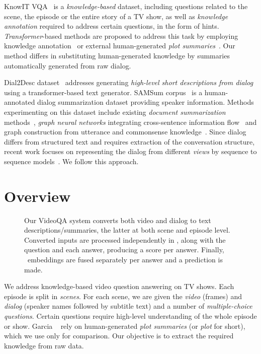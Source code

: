 \documentclass[10pt,twocolumn,letterpaper]{article}
\makeatletter
\renewcommand\paragraph{\@startsection{paragraph}{4}{\z@}{1ex}{-1em}{\normalfont\normalsize\bfseries}}
\makeatother
\begin{document}
KnowIT VQA~\cite{garcia2020knowit} is a \emph{knowledge-based} dataset, including questions related to the scene, the episode or the entire story of a TV show, as well as \emph{knowledge annotation} required to address certain questions, in the form of hints. \emph{Transformer}-based methods are proposed to address this task by employing knowledge annotation~\cite{garcia2020knowit} or external human-generated \emph{plot summaries}~\cite{garcia2020knowledge}. Our method differs in substituting human-generated knowledge by summaries automatically generated from raw dialog.



\paragraph{Dialog Summarization}   

Dial2Desc dataset~\cite{pan2018dial2desc} addresses generating \emph{high-level short descriptions from dialog} using a transformer-based text generator. SAMSum corpus~\cite{gliwa2019samsum} is a human-annotated dialog summarization dataset providing speaker information. Methods experimenting on this dataset include existing \emph{document summarization} methods~\cite{gliwa2019samsum}, \emph{graph neural networks} integrating cross-sentence information flow~\cite{zhao2020improving} and graph construction from utterance and commonsense knowledge~\cite{feng2020incorporating}. Since dialog differs from structured text and requires extraction of the conversation structure, recent work focuses on representing the dialog from different \emph{views} by sequence to sequence models~\cite{chen2020multi}. We follow this approach.

 \section{Overview}
\label{sec:over}

\begin{figure*}
\centering
\caption{Our VideoQA system converts both video and dialog to text descriptions/summaries, the latter at both scene and episode level. Converted inputs are processed independently in \branches, along with the question and each answer, producing a score per answer. Finally, \branch~embeddings are fused separately per answer and a prediction is made.}
\label{fig:over}
\end{figure*}


We address knowledge-based video question answering on TV shows. Each episode is split in \emph{scenes}. For each scene, we are given the \emph{video} (frames) and \emph{dialog} (speaker names followed by subtitle text) and a number of \emph{multiple-choice questions}. Certain questions require high-level understanding of the whole episode or show. Garcia \etal~\cite{garcia2020knowledge}  rely on human-generated \emph{plot summaries} (or \emph{plot} for short), which we use only for comparison. Our objective is to extract the required knowledge from raw data.
\end{document}
